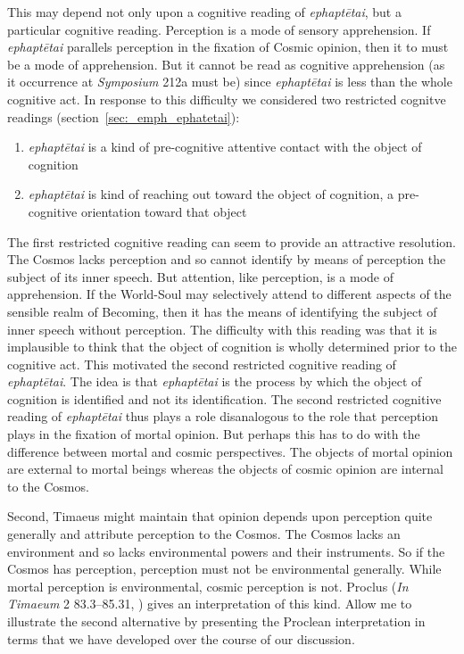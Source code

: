 This may depend not only upon a cognitive reading of \emph{ephaptētai}, but a particular cognitive reading. Perception is a mode of sensory apprehension. If \emph{ephaptētai} parallels perception in the fixation of Cosmic opinion, then it to must be a mode of apprehension. But it cannot be read as cognitive apprehension (as it occurrence at \emph{Symposium} 212a must be) since \emph{ephaptētai} is less than the whole cognitive act. In response to this difficulty we considered two restricted cognitve readings (section~\ref{sec:_emph_ephatetai}):
\begin{enumerate}[(1)]
	\item \emph{ephaptētai} is a kind of pre-cognitive attentive contact with the object of cognition
	\item \emph{ephaptētai} is kind of reaching out toward the object of cognition, a pre-cognitive orientation toward that object
\end{enumerate}
The first restricted cognitive reading can seem to provide an attractive resolution. The Cosmos lacks perception and so cannot identify by means of perception the subject of its inner speech. But attention, like perception, is a mode of apprehension. If the World-Soul may selectively attend to different aspects of the sensible realm of Becoming, then it has the means of identifying the subject of inner speech without perception. The difficulty with this reading was that it is implausible to think that the object of cognition is wholly determined prior to the cognitive act. This motivated the second restricted cognitive reading of \emph{ephaptētai}. The idea is that \emph{ephaptētai} is the process by which the object of cognition is identified and not its identification. The second restricted cognitive reading of \emph{ephaptētai} thus plays a role disanalogous to the role that perception plays in the fixation of mortal opinion. But perhaps this has to do with the difference between mortal and cosmic perspectives. The objects of mortal opinion are external to mortal beings whereas the objects of cosmic opinion are internal to the Cosmos. 

Second, Timaeus might maintain that opinion depends upon perception quite generally and attribute perception to the Cosmos. The Cosmos lacks an environment and so lacks environmental powers and their instruments. So if the Cosmos has perception, perception must not be environmental generally. While mortal perception is environmental, cosmic perception is not. Proclus (\emph{In Timaeum} 2 83.3–85.31, \citealt{Diehl:1903re}) gives an interpretation of this kind. Allow me to illustrate the second alternative by presenting the Proclean interpretation in terms that we have developed over the course of our discussion.

